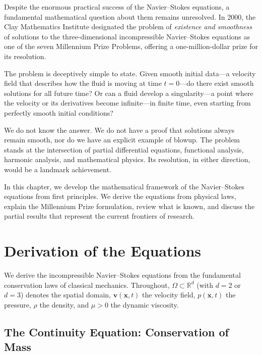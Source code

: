 Despite the enormous practical success of the Navier--Stokes equations, a fundamental mathematical question about them remains unresolved. In 2000, the Clay Mathematics Institute designated the problem of \emph{existence and smoothness} of solutions to the three-dimensional incompressible Navier--Stokes equations as one of the seven Millennium Prize Problems, offering a one-million-dollar prize for its resolution.

The problem is deceptively simple to state. Given smooth initial data---a velocity field that describes how the fluid is moving at time $t = 0$---do there exist smooth solutions for all future time? Or can a fluid develop a singularity---a point where the velocity or its derivatives become infinite---in finite time, even starting from perfectly smooth initial conditions?

We do not know the answer. We do not have a proof that solutions always remain smooth, nor do we have an explicit example of blowup. The problem stands at the intersection of partial differential equations, functional analysis, harmonic analysis, and mathematical physics. Its resolution, in either direction, would be a landmark achievement.

In this chapter, we develop the mathematical framework of the Navier--Stokes equations from first principles. We derive the equations from physical laws, explain the Millennium Prize formulation, review what is known, and discuss the partial results that represent the current frontiers of research.

\section{Derivation of the Equations}
\label{sec:NS-derivation}

We derive the incompressible Navier--Stokes equations from the fundamental conservation laws of classical mechanics. Throughout, $\Omega \subset \mathbb{R}^d$ (with $d = 2$ or $d = 3$) denotes the spatial domain, $\mathbf{v}(\mathbf{x}, t)$ the velocity field, $p(\mathbf{x}, t)$ the pressure, $\rho$ the density, and $\mu > 0$ the dynamic viscosity.

\subsection{The Continuity Equation: Conservation of Mass}

